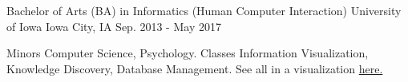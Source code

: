 \begin{cventries}
  \cventry
    {Bachelor of Arts (BA) in Informatics (Human Computer Interaction)}
    {University of Iowa}
    {Iowa City, IA}
    {Sep. 2013 - May 2017}
    {
      \begin{cvitemED}
          \cvskillED
            {Minors}
            {Computer Science, Psychology.}
          \cvskillED
            {Classes}
            {Information Visualization, Knowledge Discovery, Database Management. See all in a visualization \href{https://www.github.com/ryan-p-larson/college-sankey/}{here.}}
      \end{cvitemED}
    }
\end{cventries}
